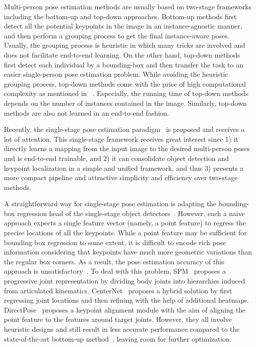 \documentclass[sigconf]{acmart}
\begin{document}
Multi-person pose estimation methods are usually based on two-stage frameworks including the bottom-up and top-down approaches.
Bottom-up methods \cite{cao2017realtime, pishchulin2016deepcut, insafutdinov2016deepercut, newell2016associative, papandreou2018personlab} first detect all the potential keypoints in the image in an instance-agnostic manner, and then perform a grouping process to get the final instance-aware poses.
Usually, the grouping process is heuristic in which many tricks are involved and does not facilitate end-to-end learning.
On the other hand, top-down methods \cite{he2017mask, fang2017rmpe, chen2018cascaded, xiao2018simple, sun2019deep, dai2021rsgnet, DBLP:conf/mm/JiangHZWX20, DBLP:conf/mm/BaoLHD020} first detect each individual by a bounding-box and then transfer the task to an easier single-person pose estimation problem. 
While avoiding the heuristic grouping process, top-down methods come with the price of high computational complexity as mentioned in ~\cite{nie2019single}.
Especially, the running time of top-down methods depends on the number of instances contained in the image.
Similarly, top-down methods are also not learned in an end-to-end fashion.

Recently, the single-stage pose estimation paradigm~\cite{nie2019single, tian2019directpose, wei2020point} is proposed and receives a lot of attention.
This single-stage framework receives great interest since 1) it directly learns a mapping from the input image to the desired multi-person poses and is end-to-end trainable, and 2) it can consolidate object detection and keypoint localization in a simple and unified framework, and thus 3) presents a more compact pipeline and attractive simplicity and efficiency over two-stage methods.

A straightforward way for single-stage pose estimation is adapting the bounding-box regression head of the single-stage object detectors~\cite{tian2019fcos, zhang2020bridging}.
However, such a naive approach expects a single feature vector (namely, a point feature) to regress the precise locations of all the keypoints.
While a point feature may be sufficient for bounding box regression to some extent, it is difficult to encode rich pose information considering that keypoints have much more geometric variations than the regular box corners.
As a result, the pose estimation accuracy of this approach is unsatisfactory~\cite{tian2019directpose}.
To deal with this problem, SPM~\cite{nie2019single} proposes a progressive joint representation by dividing body joints into hierarchies induced from articulated kinematics.
CenterNet~\cite{zhou2019objects} proposes a hybrid solution by first regressing joint locations and then refining with the help of additional heatmaps.
DirectPose~\cite{tian2019directpose} proposes a keypoint alignment module with the aim of aligning the point feature to the features around target joints.
However, they all involve heuristic designs and still result in less accurate performance compared to the state-of-the-art bottom-up method~\cite{cheng2020higherhrnet}, leaving room for further optimization. 
\end{document}

